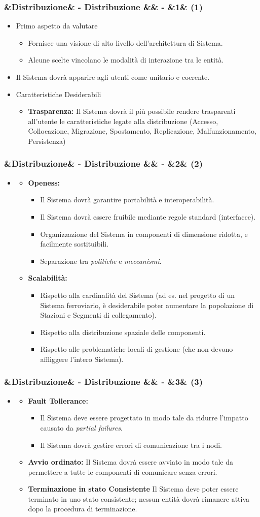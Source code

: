 \documentclass[slidestop,compress,blackandwhite]{beamer}
\newcommand{\itemB}[3]{
	\item \textbf{#1} #2 \vspace{#3}
}
\newcommand{\ii}[1]{\textit{#1}}
\newcommand{\cm}[1]{\vspace{#1cm}}
\newcommand{\newtitle}[4]{
	#1 
	\ifx&#2&%
	\else
  		\large- #2
	\fi
	\ifx&#3&%
	\else
  		\normalsize- #3
	\fi
	\ifx&#4&%
	\else
  		\normalsize (#4)
	\fi
}
\newcommand{\newframe}[5]{
	\begin{frame}
		\frametitle{\newtitle{#1}{#2}{#3}{#4}}
		#5
	\end{frame}
}
\newcommand{\myitemize}[1]{
	\begin{itemize}\itemsep4pt
	#1
	\end{itemize}
}
\begin{document}
	\newframe{}{Distribuzione}{}{1}{
		\cm{0.5}
		\myitemize {
			\item Primo aspetto da valutare
				\myitemize {
					\item Fornisce una visione di alto livello dell'architettura di Sistema.
					\item Alcune scelte vincolano le modalità di interazione tra le entità.
				}
			\cm{0.2}
			\item Il Sistema dovrà apparire agli utenti come unitario e coerente. 
			\cm{0.2}
			\item Caratteristiche Desiderabili
				\myitemize {
					\itemB{Trasparenza:}{Il Sistema dovrà il più possibile rendere trasparenti all'utente le caratteristiche legate alla distribuzione (Accesso, Collocazione, Migrazione, Spostamento, Replicazione, Malfunzionamento, Persistenza)}{0.1cm}
				}
		}
	}
	
	\newframe{}{Distribuzione}{}{2}{
		\myitemize {
			\item[]
				\myitemize {
					\itemB{Openess:}{\justifying
						\myitemize {
							\item Il Sistema dovrà garantire portabilità e interoperabilità.
							\item Il Sistema dovrà essere fruibile mediante regole standard (interfacce).
							\item \justifying Organizzazione del Sistema in componenti di dimensione ridotta, e facilmente sostituibili.
							\item Separazione tra \ii{politiche} e \ii{meccanismi}.
						}
					}{0.1cm}
					\itemB{Scalabilità:}{\justifying
						\myitemize {
							\item Rispetto alla cardinalità del Sistema (ad es. nel progetto di un Sistema ferroviario, è desiderabile poter aumentare la popolazione di Stazioni e Segmenti di collegamento).
							\item Rispetto alla distribuzione spaziale delle componenti.
							\item Rispetto alle problematiche locali di gestione (che non devono affliggere l'intero Sistema).
						}
					}{0.1cm}
				}
		}
	}
	
	\newframe{}{Distribuzione}{}{3}{
		\cm{0.5}
		\myitemize {
			\item[]
				\myitemize {
					\itemB{Fault Tollerance:}{
						\myitemize{
							\item Il Sistema deve essere progettato in modo tale da ridurre l'impatto causato da \ii{partial failures}.
							\item Il Sistema dovrà gestire errori di comunicazione tra i nodi.
						}
					}{0.1cm}
					
					\itemB{Avvio ordinato:}{\justifying Il Sistema dovrà essere avviato in modo tale da permettere a tutte le componenti di comunicare senza errori.}{0.1cm}
					\itemB{Terminazione in stato Consistente}{\justifying Il Sistema deve poter essere terminato in uno stato consistente; nessun entità dovrà rimanere attiva dopo la procedura di terminazione.}{0.1cm}
				}
				
		}
	}
	
\end{document}
